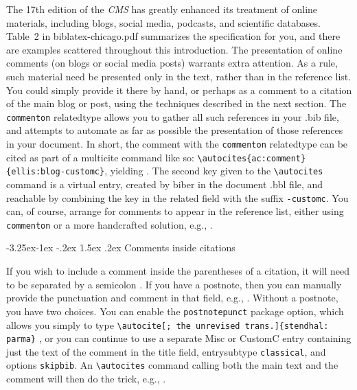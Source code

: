 \documentclass[a4paper,12pt]{article}
\makeatletter
\newcommand{\cmd}[1]{\texttt{\textbackslash #1}}
\renewcommand{\subsection}{\@startsection{subsection}{2}{\z@}%
                                     {-3.25ex\@plus -1ex \@minus -.2ex}%
                                     {1.5ex \@plus .2ex}%
                                     {\normalfont\normalsize\bfseries}}
\makeatother
\begin{document}
The 17th edition of the \emph{CMS} has greatly enhanced its treatment
of online materials, including blogs, social media, podcasts, and
scientific databases.  Table~2 in \textsf{biblatex-chicago.pdf}
 summarizes the specification for
you, and there are examples scattered throughout this introduction.
The presentation of online comments (on blogs or social media posts)
warrants extra attention.  As a rule, such material need be presented
only in the text, rather than in the reference list.  You could simply
provide it there by hand, or perhaps as a comment to a citation of the
main blog or post, using the techniques described in the next section.
The \texttt{commenton} \textsf{relatedtype}
 allows you to gather all such
references in your .bib file, and attempts to automate as far as
possible the presentation of those references in your document.  In
short, the comment  with the \texttt{commenton}
\textsf{relatedtype} can be cited as part of a multicite command like
so: \verb+\autocites{ac:comment}{ellis:blog-customc}+, yielding
\autocites{ac:comment}{ellis:blog-customc}.  The second key given to
the \cmd{autocites} command is a virtual entry, created by
\textsf{biber} in the document .bbl file, and reachable by combining
the key in the \textsf{related} field with the suffix
\texttt{-customc}.  You can, of course, arrange for comments to appear
in the reference list, either using \texttt{commenton} or a more
handcrafted solution, e.g., \autocite{viv:amlen}.

\subsection{Comments inside citations}
\label{sec:comments}

If you wish to include a comment inside the parentheses of a citation,
it will need to be separated by a semicolon
\autocite[15.24]{chicago:manual}.  If you have a \textsf{postnote},
then you can manually provide the punctuation and comment in that
field, e.g., \autocite[4; the unrevised trans.]{stendhal:parma}.
Without a \textsf{postnote}, you have two choices.  You can enable the
\texttt{postnotepunct} package option, which allows you simply to type
\cmd{autocite[; the unrevised trans.]\{stendhal:\\parma\}}
\citereset\autocite[; the unrevised trans.]{stendhal:parma}, or you
can continue to use a separate \textsf{Misc} or \textsf{CustomC} entry
containing just the text of the comment in the \textsf{title} field,
\textsf{entrysubtype} \texttt{classical}, and \textsf{options}
\texttt{skipbib}.  An \cmd{autocites} command calling both the main
text and the comment will then do the trick, e.g.,
\autocites{chicago:manual}{chicago:comment}.
\end{document}
